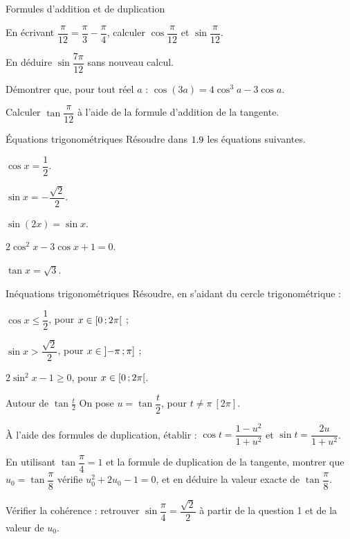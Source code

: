 \begin{exercice}[2]{Formules d'addition et de duplication}
\begin{questions}
  \item En écrivant $\dfrac{\pi}{12}=\dfrac{\pi}{3}-\dfrac{\pi}{4}$, calculer
    $\cos\dfrac{\pi}{12}$ et $\sin\dfrac{\pi}{12}$.
  \item En déduire $\sin\dfrac{7\pi}{12}$ sans nouveau calcul.
  \item Démontrer que, pour tout réel $a$ : $\cos(3a)=4\cos^{3}a-3\cos a$.
  \item Calculer $\tan\dfrac{\pi}{12}$ à l'aide de la formule d'addition de la tangente.
\end{questions}
\end{exercice}

\begin{exercice}[2]{Équations trigonométriques}
Résoudre dans $1.9$ les équations suivantes.
\begin{questions}
  \item $\cos x=\dfrac12$.
  \item $\sin x=-\dfrac{\sqrt2}{2}$.
  \item $\sin(2x)=\sin x$.
  \item $2\cos^{2}x-3\cos x+1=0$.
  \item $\tan x=\sqrt3$.
\end{questions}
\end{exercice}

\begin{exercice}[2]{Inéquations trigonométriques}
Résoudre, en s'aidant du cercle trigonométrique :
\begin{questions}
  \item $\cos x\leq\dfrac12$, pour $x\in\mathopen{[}0\,{;}\,2\pi\mathclose{[}$ ;
  \item $\sin x>\dfrac{\sqrt2}{2}$, pour $x\in\mathopen{]}-\pi\,{;}\,\pi\mathclose{]}$ ;
  \item $2\sin^{2}x-1\geq0$, pour $x\in\mathopen{[}0\,{;}\,2\pi\mathclose{[}$.
\end{questions}
\end{exercice}

\begin{exercice}[2]{Autour de $\tan\frac{t}{2}$}
On pose $u=\tan\dfrac{t}{2}$, pour $t\neq\pi\ [2\pi]$.
\begin{questions}
  \item À l'aide des formules de duplication, établir :
    $\cos t=\dfrac{1-u^{2}}{1+u^{2}}$ et $\sin t=\dfrac{2u}{1+u^{2}}$.
  \item En utilisant $\tan\dfrac{\pi}{4}=1$ et la formule de duplication de la
    tangente, montrer que $u_0=\tan\dfrac{\pi}{8}$ vérifie $u_0^{2}+2u_0-1=0$,
    et en déduire la valeur exacte de $\tan\dfrac{\pi}{8}$.
  \item Vérifier la cohérence : retrouver $\sin\dfrac{\pi}{4}=\dfrac{\sqrt2}{2}$
    à partir de la question 1 et de la valeur de $u_0$.
\end{questions}
\end{exercice}

